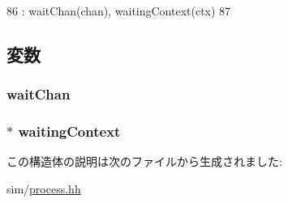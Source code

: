 \begin{DoxyCode}
86             : waitChan(chan), waitingContext(ctx)
87         {       }
\end{DoxyCode}


\subsection{変数}
\hypertarget{structProcess_1_1WaitRec_a4e0bff73adcc46aa65c3e7f45803df17}{
\subsubsection[{waitChan}]{ {\bf waitChan}}}
\label{structProcess_1_1WaitRec_a4e0bff73adcc46aa65c3e7f45803df17}
\hypertarget{structProcess_1_1WaitRec_af05343af1b3beaa38b21020a12e74a03}{
\subsubsection[{waitingContext}]{$\ast$ {\bf waitingContext}}}
\label{structProcess_1_1WaitRec_af05343af1b3beaa38b21020a12e74a03}


この構造体の説明は次のファイルから生成されました:\begin{DoxyCompactItemize}
\item 
sim/\hyperlink{sim_2process_8hh}{process.hh}\end{DoxyCompactItemize}
